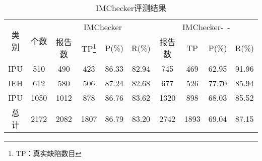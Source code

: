 \begin{table}[t]
	\centering
	\begin{minipage}[t]{0.9\linewidth} %
		\caption{IMChecker评测结果}
		\label{tab:3-4-imchecker}
		\begin{tabular}{cccccccccc}
			\hline
			\multirow{2}{*}{类别 } & \multirow{2}{*}{个数} & \multicolumn{4}{c}{IMChecker} & \multicolumn{4}{c}{IMChecker-~-} \\
			\cline{3-10}
			 & & 报告数 & TP\footnote{TP：真实缺陷数目} & P(\%) & R(\%) & 报告数 & TP& P(\%) & R(\%) \\
			 \hline
			 IPU & 510 & 490 & 423 & 86.33 & 82.94 & 745 & 469 & 62.95 & 91.96 \\
			 IEH & 612 & 580 & 506 & 87.24 & 82.68 & 677 & 526 & 77.70 & 85.94 \\
			 IPU & 1050 & 1012 & 878 & 86.76 & 83.62 & 1320 & 898 & 68.03 & 85.52 \\
			 总计 & 2172 &  2082 & 1807 & 86.79 & 83.20 & 2742 & 1893 & 69.04 & 87.15 \\
			\hline
		\end{tabular}
	\end{minipage}
\end{table}